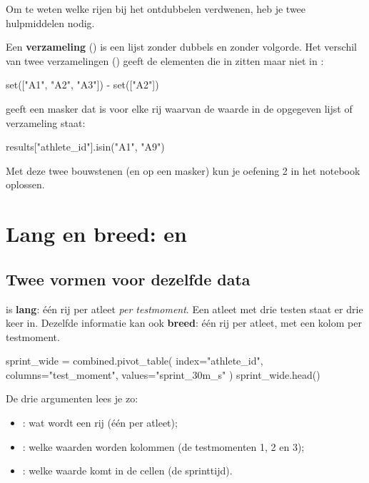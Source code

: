 \documentclass[11pt,a4paper]{article}
\begin{document}
Om te weten welke rijen bij het ontdubbelen verdwenen, heb je twee
hulpmiddelen nodig.

Een \textbf{verzameling} () is een lijst zonder dubbels en
zonder volgorde. Het verschil van twee verzamelingen () geeft
de elementen die in  zitten maar niet in :

\begin{python}
set(["A1", "A2", "A3"]) - set(["A2"])
\end{python}

 geeft een masker dat  is voor elke rij
waarvan de waarde in de opgegeven lijst of verzameling staat:

\begin{python}
results["athlete_id"].isin({"A1", "A9"})
\end{python}

Met deze twee bouwstenen (en  op een masker) kun je
oefening 2 in het notebook oplossen.

\section{Lang en breed:  en }

\subsection{Twee vormen voor dezelfde data}

 is \textbf{lang}: één rij per atleet \emph{per
testmoment}. Een atleet met drie testen staat er drie keer in. Dezelfde
informatie kan ook \textbf{breed}: één rij per atleet, met een kolom per
testmoment.

\begin{python}
sprint_wide = combined.pivot_table(
    index="athlete_id", columns="test_moment", values="sprint_30m_s"
)
sprint_wide.head()
\end{python}

De drie argumenten lees je zo:
\begin{itemize}
  \item {}: wat wordt een rij (één per atleet);
  \item {}: welke waarden worden kolommen (de testmomenten
        1, 2 en 3);
  \item {}: welke waarde komt in de cellen (de sprinttijd).
\end{itemize}
\end{document}
